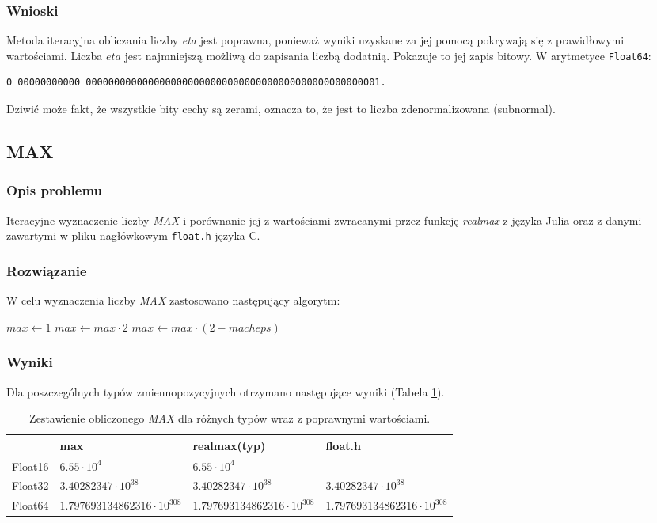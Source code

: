 \documentclass[11pt,a4paper]{article}
\begin{document}
\subsubsection{Wnioski}
Metoda iteracyjna obliczania liczby \emph{eta} jest poprawna, ponieważ wyniki uzyskane za jej pomocą pokrywają się z prawidłowymi wartościami. Liczba $eta$ jest najmniejszą możliwą do zapisania liczbą dodatnią. Pokazuje to jej zapis bitowy. W arytmetyce \texttt{Float64}:
\begin{verbatim}
0 00000000000 0000000000000000000000000000000000000000000000000001.
\end{verbatim}
Dziwić może fakt, że wszystkie bity cechy są zerami, oznacza to, że jest to liczba zdenormalizowana (subnormal).

\subsection{MAX}
\subsubsection{Opis problemu}
Iteracyjne wyznaczenie liczby \emph{MAX} i porównanie jej z wartościami zwracanymi przez funkcję \emph{realmax} z języka Julia oraz z danymi zawartymi w pliku nagłówkowym \texttt{float.h} języka C.
\subsubsection{Rozwiązanie}
W celu wyznaczenia liczby \emph{MAX} zastosowano następujący algorytm:
\begin{algorithmic}
\State $max\gets 1$
    \State $max\gets max\cdot 2$
\EndWhile
\State $max\gets max\cdot (2-macheps)$
\end{algorithmic}
\subsubsection{Wyniki}
Dla poszczególnych typów zmiennopozycyjnych otrzymano następujące wyniki (Tabela \ref{table:3}).
\begin{table}[!h]
\centering
\begin{tabular}{l | l | l | l}
& max & realmax(typ) & float.h \\ \hline
Float16 & $6.55\cdot 10^{4}$ & $6.55\cdot 10^{4}$ & --- \\
Float32 & $3.40282347\cdot 10^{38}$ & $3.40282347\cdot 10^{38}$ & $3.40282347\cdot 10^{38}$ \\
Float64 & $1.797693134862316\cdot 10^{308}$ & $1.797693134862316\cdot 10^{308}$ & $1.797693134862316\cdot 10^{308}$ \\
\end{tabular}
\caption{\label{table:3}Zestawienie obliczonego \emph{MAX} dla różnych typów wraz z poprawnymi wartościami.}
\end{table}
\end{document}
